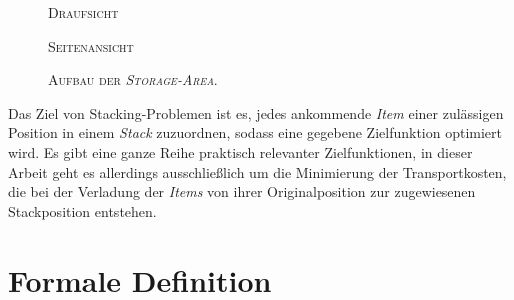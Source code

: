 \begin{figure}[H]
\centering
{}
\caption*{\textsc{Draufsicht}}
\end{figure}
\begin{figure}[H]
\centering
{}
\caption*{\textsc{Seitenansicht}}

\caption{\textsc{Aufbau der \textit{Storage-Area}}.}
\label{fig:storage_area}
\end{figure}

Das Ziel von Stacking-Problemen ist es, jedes ankommende \textit{Item} einer zulässigen Position in einem
\textit{Stack} zuzuordnen, sodass eine gegebene Zielfunktion optimiert wird. Es gibt eine ganze Reihe praktisch relevanter Zielfunktionen,
in dieser Arbeit geht es allerdings ausschließlich um die Minimierung der Transportkosten, die bei der Verladung der \textit{Items} von ihrer Originalposition zur zugewiesenen Stackposition entstehen.

\pagebreak

\section{Formale Definition}
\label{sec:formal_definition}

